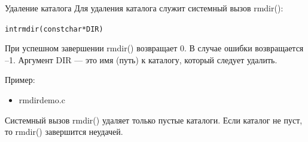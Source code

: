 \documentclass{beamer}
\begin{document}
\begin{frame}[fragile]{Удаление каталога}
Для удаления каталога служит системный вызов rmdir():
\begin{alltt}
int rmdir (const char * DIR)
\end{alltt}
При успешном завершении rmdir() возвращает 0. В случае ошибки возвращается –1. Аргумент DIR — это имя (путь) к каталогу, который следует удалить.

Пример: 
\begin{itemize}
\item rmdirdemo.c
\end{itemize}
Системный вызов rmdir() удаляет только пустые каталоги. Если каталог не пуст, то rmdir() завершится неудачей.
\end{frame}

\end{document}
